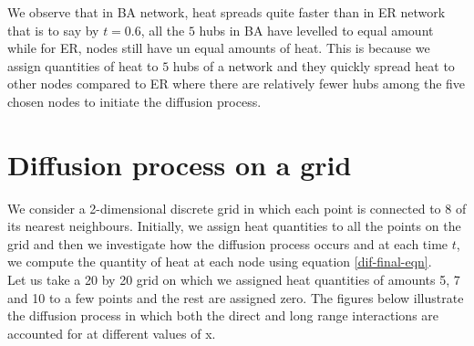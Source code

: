 \documentclass[10pt,a4paper]{article}
\begin{document}
We observe that in BA network, heat spreads quite faster than in ER network that is to say by $t=0.6$, all the $5$ hubs in BA have levelled to equal amount while for ER, nodes still have un equal amounts of heat. This is because we assign quantities of heat to $5$ hubs of a network and they quickly spread heat to other nodes compared to ER where there are relatively fewer hubs among the five chosen nodes to initiate the diffusion process.

\section{Diffusion process on a grid}
We consider a 2-dimensional discrete grid in which each point is connected to 8 of its nearest neighbours. Initially, we assign heat quantities to all the points on the grid and then we investigate how the diffusion process occurs and at each time $t$, we compute the quantity of heat at each node using equation \ref{dif-final-eqn}. \\
Let us take a 20 by 20 grid on which we assigned heat quantities of amounts 5, 7 and 10 to a few points and the rest are assigned zero. The figures below illustrate the diffusion process in which both the direct and long range interactions are accounted for at different values of x.
\end{document}
